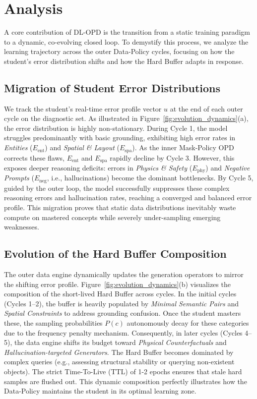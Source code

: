 \section{Analysis}
\label{sec:analysis}

A core contribution of DL-OPD is the transition from a static training paradigm to a dynamic, co-evolving closed loop. To demystify this process, we analyze the learning trajectory across the outer Data-Policy cycles, focusing on how the student's error distribution shifts and how the Hard Buffer adapts in response.

\subsection{Migration of Student Error Distributions}
\label{subsec:error_migration}

We track the student's real-time error profile vector $u$ at the end of each outer cycle on the diagnostic set. As illustrated in Figure~\ref{fig:evolution_dynamics}(a), the error distribution is highly non-stationary. 
During Cycle 1, the model struggles predominantly with basic grounding, exhibiting high error rates in \textit{Entities} ($E_{\mathrm{ent}}$) and \textit{Spatial \& Layout} ($E_{\mathrm{spa}}$). As the inner Mask-Policy OPD corrects these flaws, $E_{\mathrm{ent}}$ and $E_{\mathrm{spa}}$ rapidly decline by Cycle 3. 
However, this exposes deeper reasoning deficits: errors in \textit{Physics \& Safety} ($E_{\mathrm{phy}}$) and \textit{Negative Prompts} ($E_{\mathrm{neg}}$, i.e., hallucinations) become the dominant bottlenecks. By Cycle 5, guided by the outer loop, the model successfully suppresses these complex reasoning errors and hallucination rates, reaching a converged and balanced error profile. This migration proves that static data distributions inevitably waste compute on mastered concepts while severely under-sampling emerging weaknesses.

\subsection{Evolution of the Hard Buffer Composition}
\label{subsec:buffer_evolution}

The outer data engine dynamically updates the generation operators to mirror the shifting error profile. Figure~\ref{fig:evolution_dynamics}(b) visualizes the composition of the short-lived Hard Buffer across cycles.
In the initial cycles (Cycles 1--2), the buffer is heavily populated by \textit{Minimal Semantic Pairs} and \textit{Spatial Constraints} to address grounding confusion. Once the student masters these, the sampling probabilities $P(c)$ autonomously decay for these categories due to the frequency penalty mechanism. 
Consequently, in later cycles (Cycles 4--5), the data engine shifts its budget toward \textit{Physical Counterfactuals} and \textit{Hallucination-targeted Generators}. The Hard Buffer becomes dominated by complex queries (e.g., assessing structural stability or querying non-existent objects). The strict Time-To-Live (TTL) of 1-2 epochs ensures that stale hard samples are flushed out. This dynamic composition perfectly illustrates how the Data-Policy maintains the student in its optimal learning zone.

